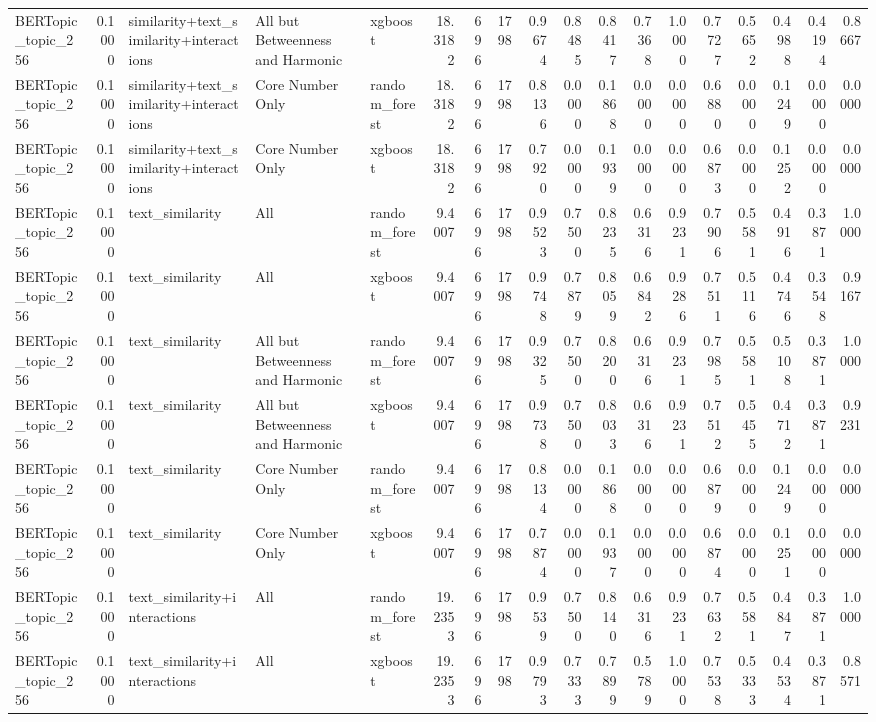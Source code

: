 \begin{tabular}{lrlllrrrrrrrrrrrrr}
BERTopic_topic_256 & 0.1000 & similarity+text_similarity+interactions & All but Betweenness and Harmonic & xgboost & 18.3182 & 696 & 1798 & 0.9674 & 0.8485 & 0.8417 & 0.7368 & 1.0000 & 0.7727 & 0.5652 & 0.4988 & 0.4194 & 0.8667 \\
BERTopic_topic_256 & 0.1000 & similarity+text_similarity+interactions & Core Number Only & random_forest & 18.3182 & 696 & 1798 & 0.8136 & 0.0000 & 0.1868 & 0.0000 & 0.0000 & 0.6880 & 0.0000 & 0.1249 & 0.0000 & 0.0000 \\
BERTopic_topic_256 & 0.1000 & similarity+text_similarity+interactions & Core Number Only & xgboost & 18.3182 & 696 & 1798 & 0.7920 & 0.0000 & 0.1939 & 0.0000 & 0.0000 & 0.6873 & 0.0000 & 0.1252 & 0.0000 & 0.0000 \\
BERTopic_topic_256 & 0.1000 & text_similarity & All & random_forest & 9.4007 & 696 & 1798 & 0.9523 & 0.7500 & 0.8235 & 0.6316 & 0.9231 & 0.7906 & 0.5581 & 0.4916 & 0.3871 & 1.0000 \\
BERTopic_topic_256 & 0.1000 & text_similarity & All & xgboost & 9.4007 & 696 & 1798 & 0.9748 & 0.7879 & 0.8059 & 0.6842 & 0.9286 & 0.7511 & 0.5116 & 0.4746 & 0.3548 & 0.9167 \\
BERTopic_topic_256 & 0.1000 & text_similarity & All but Betweenness and Harmonic & random_forest & 9.4007 & 696 & 1798 & 0.9325 & 0.7500 & 0.8200 & 0.6316 & 0.9231 & 0.7985 & 0.5581 & 0.5108 & 0.3871 & 1.0000 \\
BERTopic_topic_256 & 0.1000 & text_similarity & All but Betweenness and Harmonic & xgboost & 9.4007 & 696 & 1798 & 0.9738 & 0.7500 & 0.8033 & 0.6316 & 0.9231 & 0.7512 & 0.5455 & 0.4712 & 0.3871 & 0.9231 \\
BERTopic_topic_256 & 0.1000 & text_similarity & Core Number Only & random_forest & 9.4007 & 696 & 1798 & 0.8134 & 0.0000 & 0.1868 & 0.0000 & 0.0000 & 0.6879 & 0.0000 & 0.1249 & 0.0000 & 0.0000 \\
BERTopic_topic_256 & 0.1000 & text_similarity & Core Number Only & xgboost & 9.4007 & 696 & 1798 & 0.7874 & 0.0000 & 0.1937 & 0.0000 & 0.0000 & 0.6874 & 0.0000 & 0.1251 & 0.0000 & 0.0000 \\
BERTopic_topic_256 & 0.1000 & text_similarity+interactions & All & random_forest & 19.2353 & 696 & 1798 & 0.9539 & 0.7500 & 0.8140 & 0.6316 & 0.9231 & 0.7632 & 0.5581 & 0.4847 & 0.3871 & 1.0000 \\
BERTopic_topic_256 & 0.1000 & text_similarity+interactions & All & xgboost & 19.2353 & 696 & 1798 & 0.9793 & 0.7333 & 0.7899 & 0.5789 & 1.0000 & 0.7538 & 0.5333 & 0.4534 & 0.3871 & 0.8571 \\

\end{tabular}

